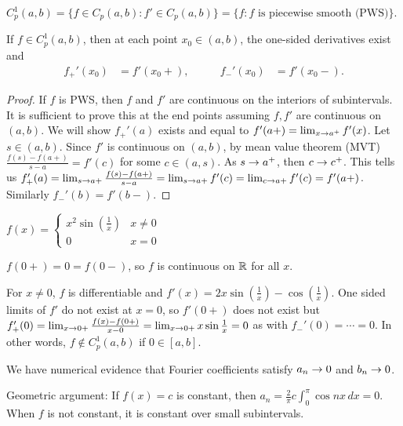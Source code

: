 \documentclass[]{article}
\begin{document}
\begin{definition}
	$C_p^1(a,b) = \{f\in C_p(a,b):f'\in C_p(a,b)\} = \{f: f\text{ is piecewise smooth (PWS)}\}$.
\end{definition}
\begin{theorem}
	If $f\in C_p^1(a,b)$, then at each point $x_0\in(a,b)$, the one-sided derivatives exist and \begin{align} f_+'(x_0) &= f'(x_0+), &\qquad f_-'(x_0) &= f'(x_0-).\end{align}
\end{theorem}
\begin{proof}
	If $f$ is PWS, then $f$ and $f'$ are continuous on the interiors of subintervals.
	It is sufficient to prove this at the end points assuming $f,f'$ are continuous on $(a,b)$.
	We will show $f_+'(a)$ exists and equal to $f'(a+) = \lim_{x\rightarrow a^+} f'(x)$.
	Let $s\in(a,b)$. Since $f'$ is continuous on $(a,b)$, by mean value theorem (MVT) $\frac{f(s)-f(a+)}{s-a} = f'(c)$ for some $c\in(a,s)$.
	As $s\rightarrow a^+$, then $c\rightarrow c^+$. This tells us $ f_+'(a) = \lim_{s\rightarrow a+} \frac{f(s) - f(a+)}{s-a} = \lim_{s\rightarrow a+} f'(c) = \lim_{c\rightarrow a+} f'(c) = f'(a+)$.
	Similarly $f_-'(b) = f'(b-)$.
\end{proof}
\begin{example}
	$f(x) = \begin{cases} x^2\sin{\left(\frac{1}{x}\right)} & x\neq 0 \\ 0 & x=0 \end{cases}$
	\begin{note}
		$f(0+) = 0 = f(0-)$, so $f$ is continuous on $\mathbb{R}$ for all $x$.
	\end{note}
	For $x\neq 0$, $f$ is differentiable and $f'(x) = 2x\sin{\left(\frac{1}{x}\right)} - \cos{\left(\frac{1}{x}\right)}$.
	One sided limits of $f'$ do not exist at $x=0$, so $f'(0+)$ does not exist but $f_+'(0)=\lim_{x\rightarrow 0+} \frac{f(x)-f(0+)}{x-0} = \lim_{x\rightarrow 0+} x \sin{\frac{1}{x}}=0$ as with $f_-'(0)=\cdots=0$. In other words, $f\notin C_p^1(a,b)$ if $0\in [a,b]$.
\end{example}

\begin{recall}
	We have numerical evidence that Fourier coefficients satisfy $a_n\rightarrow0$ and $b_n\rightarrow 0$.
\end{recall}
Geometric argument: If $f(x) = c$ is constant, then $a_n=\frac{2}{\pi} c\int_0^\pi \cos{nx}\, dx = 0$. When $f$ is not constant, it is  constant over small subintervals.
\end{document}
